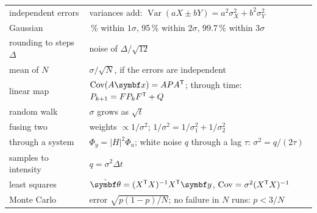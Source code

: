 \begin{result}
\begin{center}\small
\renewcommand{\arraystretch}{1.4}
\begin{tabularx}{\linewidth}{@{}l>{\raggedright\arraybackslash}X@{}}
independent errors & variances add: $\operatorname{Var}(aX \pm bY) = a^2\sigma_X^2 + b^2\sigma_Y^2$\\
Gaussian & 68\,\% within $1\sigma$, 95\,\% within $2\sigma$, 99.7\,\% within $3\sigma$\\
rounding to steps $\Delta$ & noise of $\Delta/\sqrt{12}$\\
mean of $N$ & $\sigma/\sqrt N$, if the errors are independent\\
linear map & $\operatorname{Cov}(A\vx) = APA^\T$; through time: $P_{k+1} = FP_kF^{\mathsf{T}} + Q$\\
random walk & $\sigma$ grows as $\sqrt t$\\
fusing two & weights $\propto 1/\sigma^2$; $1/\sigma^2 = 1/\sigma_1^2 + 1/\sigma_2^2$\\
through a system & $\Phi_y = |H|^2\Phi_u$; white noise $q$ through a lag $\tau$: $\sigma^2 = q/(2\tau)$\\
samples to intensity & $q = \sigma^2\Delta t$\\
least squares & $\hat{\symbf\theta} = (X^\T X)^{-1}X^\T\symbf y$, $\operatorname{Cov} = \sigma^2(X^{\mathsf{T}} X)^{-1}$\\
Monte Carlo & error $\sqrt{p(1 - p)/N}$; no failure in $N$ runs: $p < 3/N$\\
\end{tabularx}
\end{center}
\end{result}
